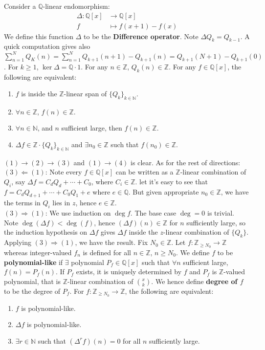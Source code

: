 \documentclass[12pt]{article}
\theoremstyle{definition}
\theoremstyle{plain}
\newcommand{\nat}{\mathbb{N}}
\newcommand{\rat}{\mathbb{Q}}
\newcommand{\z}{\mathbb{Z}}
\begin{document}
\medskip
Consider a $\rat$-linear endomorphism:
\begin{align*}
  \Delta: \rat[x]&\to \rat[x]\\
  f&\mapsto f(x+1)-f(x)
\end{align*}
We define this function $\Delta$ to be the \textbf{Difference operator}. Note $\Delta Q_k=Q_{k-1}$. A quick computation gives also $\sum_{n=1}^N Q_K(n)=\sum_{n=1}^N Q_{k+1}(n+1)-Q_{k+1}(n)=Q_{k+1}(N+1)-Q_{k+1}(0)$.
\Rmk For $k\geq 1$, $\ker \Delta= \rat\cdot 1$. For any $n\in \z$, $Q_k(n)\in \z$.
\Lemma For any $f\in \rat[x]$, the following are equivalent:
\begin{enumerate}
  \item $f$ is inside the $\z$-linear span of $\{Q_k\}_{k\in \nat}$.
  \item $\forall n\in \z$, $f(n)\in \z$.
  \item $\forall n\in \nat$, and $n$ sufficient large, then $f(n)\in \z$.
  \item $\Delta f \in \z\cdot \{Q_k\}_{k\in \nat}$ and $\exists n_0\in \z$ such that $f(n_0)\in \z$.
\end{enumerate}
\proof $(1)\to (2)\to (3)$ and $(1)\to (4)$ is clear. As for the rest of directions:\\
$(3)\Leftarrow (1)$: Note every $f\in \rat[x]$ can be written as a $\z$-linear combination of $Q_i$, say $\Delta f=C_dQ_d+\cdots +C_0$, where $C_i\in \z$. let it's easy to see that $f=C_dQ_{d+1}+\cdots +C_0Q_1+e$ where $e\in \rat$. But given appropriate $n_0\in \z$, we have the terms in $Q_i$ lies in $z$, hence $e\in \z$.\\
\indent $(3)\Rightarrow (1)$: We use induction on $\deg f$. The base case $\deg=0$ is trivial. Note $\deg(\Delta f)<\deg(f)$, hence $(\Delta f)(n)\in \z$ for $n$ sufficiently large, so the induction hypothesis on $\Delta f$ gives $\Delta f$ inside the $z$-linear combination of $\{Q_k\}$. Applying $(3)\Rightarrow (1)$, we have the result. \qedhere
\Def Fix $N_0\in \z$. Let $f:\z_{\geq N_0}\to \z$ whereas integer-valued $f_n$ is defined for all $n\in \z$, $n\geq N_0$. We define $f$ to be \textbf{polynomial-like} if $\exists$ polynomial $P_f\in \rat[x]$ such that $\forall n$ sufficient large, $f(n)=P_f(n)$.
\Rmk If $P_f$ exists, it is uniquely determined by $f$ and $P_f$ is $\z$-valued polynomial, that is $\z$-linear combination of $\binom{x}{k}$. We hence define \textbf{degree of $f$} to be the degree of $P_f$.
\Lemma For $f:\z_{\geq N_0}\to \z$, the following are equivalent:
\begin{enumerate}
  \item $f$ is polynomial-like.
  \item $\Delta f$ is polynomial-like.
  \item $\exists r\in \nat$ such that $(\Delta^r f)(n)=0$ for all $n$ sufficiently large.
\end{enumerate}
\end{document}
